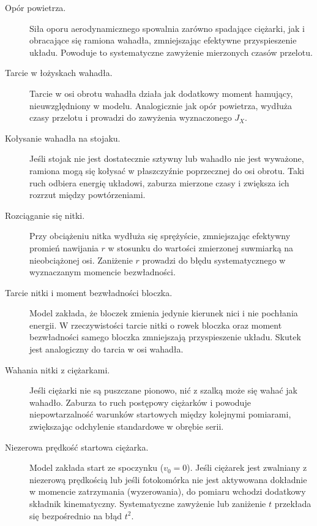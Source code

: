 \documentclass[12pt, a4paper]{article}
\begin{document}
\begin{description}
    \item[Opór powietrza.] Siła oporu aerodynamicznego spowalnia zarówno spadające ciężarki, jak i obracające się ramiona wahadła, zmniejszając efektywne przyspieszenie układu. Powoduje to systematyczne zawyżenie mierzonych czasów przelotu.

    \item[Tarcie w łożyskach wahadła.] Tarcie w osi obrotu wahadła działa jak dodatkowy moment hamujący, nieuwzględniony w modelu. Analogicznie jak opór powietrza, wydłuża czasy przelotu i prowadzi do zawyżenia wyznaczonego $J_X$.

    \item[Kołysanie wahadła na stojaku.] Jeśli stojak nie jest dostatecznie sztywny lub wahadło nie jest wyważone, ramiona mogą się kołysać w płaszczyźnie poprzecznej do osi obrotu. Taki ruch odbiera energię układowi, zaburza mierzone czasy i zwiększa ich rozrzut między powtórzeniami.

    \item[Rozciąganie się nitki.] Przy obciążeniu nitka wydłuża się sprężyście, zmniejszając efektywny promień nawijania $r$ w stosunku do wartości zmierzonej suwmiarką na nieobciążonej osi. Zaniżenie $r$ prowadzi do błędu systematycznego w wyznaczanym momencie bezwładności.

    \item[Tarcie nitki i moment bezwładności bloczka.] Model zakłada, że bloczek zmienia jedynie kierunek nici i nie pochłania energii. W rzeczywistości tarcie nitki o rowek bloczka oraz moment bezwładności samego bloczka zmniejszają przyspieszenie układu. Skutek jest analogiczny do tarcia w osi wahadła.

    \item[Wahania nitki z ciężarkami.] Jeśli ciężarki nie są puszczane pionowo, nić z szalką może się wahać jak wahadło. Zaburza to ruch postępowy ciężarków i powoduje niepowtarzalność warunków startowych między kolejnymi pomiarami, zwiększając odchylenie standardowe w obrębie serii.

    \item[Niezerowa prędkość startowa ciężarka.] Model zakłada start ze spoczynku ($v_0 = 0$). Jeśli ciężarek jest zwalniany z niezerową prędkością lub jeśli fotokomórka nie jest aktywowana dokładnie w momencie zatrzymania (wyzerowania), do pomiaru wchodzi dodatkowy składnik kinematyczny. Systematyczne zawyżenie lub zaniżenie $t$ przekłada się bezpośrednio na błąd $t^2$.
\end{description}
\end{document}
